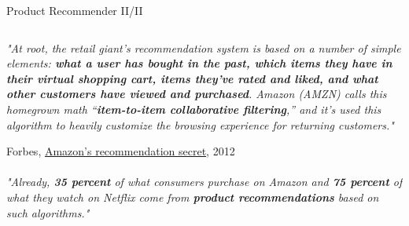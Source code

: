 \documentclass[main.tex]{subfiles}
\begin{document}
    \begin{frame}{Product Recommender II/II}
        \begin{columns}
            \begin{column}{.6\textwidth}
                \begin{justify}
                    \textit{"At root, the retail giant’s recommendation system is based on a number of simple elements: \textbf{what a user has bought in the past, which items they have in their virtual shopping cart, items they’ve rated and liked, and what other customers have viewed and purchased}. Amazon (AMZN) calls this homegrown math “\textbf{item-to-item collaborative filtering},” and it’s used this algorithm to heavily customize the browsing experience for returning customers."}
                    \vspace*{1mm}
                    
                    Forbes, \href{https://fortune.com/2012/07/30/amazons-recommendation-secret/}{Amazon’s recommendation secret}, 2012
                    \\~\\                    
                    \textit{"Already, \textbf{35 percent} of what consumers purchase on Amazon and \textbf{75 percent} of what they watch on Netflix come from \textbf{product recommendations} based on such algorithms."}
                    \vspace*{1mm}
                    

\end{justify}
\end{column}
\end{columns}
\end{frame}
\end{document}
